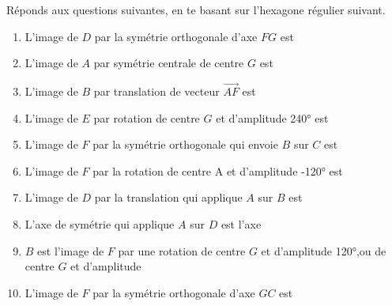 %
%
  Réponds aux questions suivantes, en te basant sur l'hexagone régulier suivant.
  \begin{center}
    
  \end{center}
  \begin{enumerate}[itemsep=2ex]
    \item L'image de $D$ par la symétrie orthogonale d'axe $FG$ est \dotfill
    \item L'image de $A$ par symétrie centrale de centre $G$ est \dotfill
    \item L'image de $B$ par translation de vecteur $\overrightarrow{AF}$ \dotfill
          est \dotfill
    \item L'image de $E$ par rotation de centre $G$ et d'amplitude \ang{+240} est \dotfill
    \item L'image de $F$ par la symétrie orthogonale qui envoie $B$ sur $C$ est \dotfill
    \item L'image de $F$ par la rotation de centre A et d'amplitude \ang{-120} est \dotfill
    \item L'image de $D$ par la translation qui applique $A$ sur $B$ est \dotfill
    \item L'axe de symétrie qui applique $A$ sur $D$ est l'axe \dotfill
    \item $B$ est l'image de $F$ par une rotation de centre $G$ et d'amplitude \ang{+120},ou de centre $G$ et d'amplitude \dotfill
    \item L'image de $F$ par la symétrie orthogonale d'axe $GC$ est \dotfill
  \end{enumerate}
